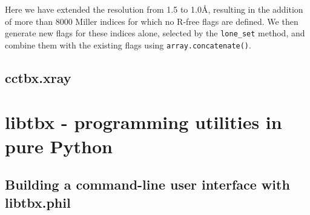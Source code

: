 \documentclass{article}
\begin{document}
Here we have extended the resolution from 1.5 to 1.0Å, resulting in the
addition of more than 8000 Miller indices for which no R-free flags are
defined.  We then generate new flags for these indices alone, selected by the
{\tt lone\_set} method, and combine them with the existing flags using
{\tt array.concatenate()}.




\subsection{cctbx.xray}


\section{libtbx - programming utilities in pure Python}


\subsection{Building a command-line user interface with libtbx.phil}
\end{document}
